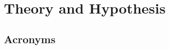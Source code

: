 \documentclass[listof=flat,a4paper,12pt,headsepline,bibliography=totoc,listof=totoc,index=totoc,cleardoublepage=empty,numbers=noenddot,headings=normal]{scrreprt}
\begin{document}
 
\renewcommand{\thepage}{\roman{page}}
\setcounter{page}{1}

\onehalfspacing

\renewcommand\contentsname{Table of Contents}
\tableofcontents


\chapter{Theory and Hypothesis}












\section{Acronyms}



\end{document}
